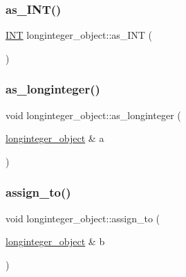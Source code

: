 \mbox{\label{classlonginteger__object_afb992d4679a6741acc63c8bcba27971e}} 
\subsubsection{\texorpdfstring{as\+\_\+\+I\+N\+T()}{as\_INT()}}
{\footnotesize\ttfamily \mbox{\hyperlink{galois_8h_a09fddde158a3a20bd2dcadb609de11dc}{I\+NT}} longinteger\+\_\+object\+::as\+\_\+\+I\+NT (\begin{DoxyParamCaption}{ }\end{DoxyParamCaption})}

\mbox{\label{classlonginteger__object_af897a2019089bccd058062603480b8f9}} 
\subsubsection{\texorpdfstring{as\+\_\+longinteger()}{as\_longinteger()}}
{\footnotesize\ttfamily void longinteger\+\_\+object\+::as\+\_\+longinteger (\begin{DoxyParamCaption}\item[{\mbox{\hyperlink{classlonginteger__object}{longinteger\+\_\+object}} \&}]{a }\end{DoxyParamCaption})}

\mbox{\label{classlonginteger__object_a891b9d0947bfce181245ab5cffe9482a}} 
\subsubsection{\texorpdfstring{assign\+\_\+to()}{assign\_to()}}
{\footnotesize\ttfamily void longinteger\+\_\+object\+::assign\+\_\+to (\begin{DoxyParamCaption}\item[{\mbox{\hyperlink{classlonginteger__object}{longinteger\+\_\+object}} \&}]{b }\end{DoxyParamCaption})}


